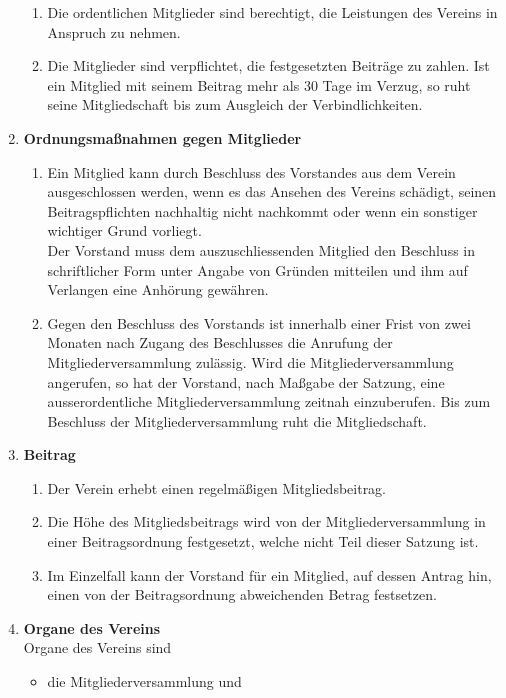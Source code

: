 \begin{enumerate}[label=\bfseries §\arabic*]
\begin{enumerate}[label=\bfseries (\arabic*)]
      \item Die ordentlichen Mitglieder sind berechtigt, die Leistungen des Vereins in Anspruch zu nehmen.
      \item Die Mitglieder sind verpflichtet, die festgesetzten Beiträge zu zahlen. Ist ein Mitglied mit seinem Beitrag mehr als 30 Tage im Verzug, so ruht seine
Mitgliedschaft bis zum Ausgleich der Verbindlichkeiten.
    \end{enumerate}
  \item \textbf{Ordnungsmaßnahmen gegen Mitglieder}
    \begin{enumerate}[label=\bfseries (\arabic*)]
      \item Ein Mitglied kann durch Beschluss des Vorstandes aus dem Verein ausgeschlossen werden, wenn es das Ansehen des Vereins schädigt, seinen Beitragspflichten nachhaltig nicht nachkommt oder wenn ein sonstiger wichtiger Grund vorliegt.\\ Der Vorstand muss dem auszuschliessenden Mitglied den Beschluss in schriftlicher Form unter Angabe von Gründen mitteilen und ihm auf Verlangen eine Anhörung gewähren.
      \item Gegen den Beschluss des Vorstands ist innerhalb einer Frist von zwei Monaten nach Zugang des Beschlusses die Anrufung der Mitgliederversammlung zulässig. Wird die Mitgliederversammlung angerufen, so hat der Vorstand, nach Maßgabe der Satzung, eine ausserordentliche Mitgliederversammlung zeitnah einzuberufen. Bis zum Beschluss der Mitgliederversammlung ruht die Mitgliedschaft.
    \end{enumerate}
  \item \textbf{Beitrag}
    \begin{enumerate}[label=\bfseries (\arabic*)]
      \item Der Verein erhebt einen regelmäßigen Mitgliedsbeitrag.
      \item Die Höhe des Mitgliedsbeitrags wird von der Mitgliederversammlung in einer Beitragsordnung festgesetzt, welche nicht Teil dieser Satzung ist.
      \item Im Einzelfall kann der Vorstand für ein Mitglied, auf dessen Antrag hin, einen von der Beitragsordnung abweichenden Betrag festsetzen.
    \end{enumerate}
  \item \textbf{Organe des Vereins}\\
    Organe des Vereins sind
    \begin{itemize}
      \item die Mitgliederversammlung und

\end{itemize}
\end{enumerate}

